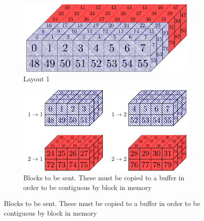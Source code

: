 \begin{figure}[p]
 \begin{center}
 \begin{subfigure}[t]{0.45\textwidth}
  \centering
  \includegraphics[width=\textwidth]{Figs/SplitConcat3D/Layout1}
  \caption{Layout 1}
 \end{subfigure}
 \hspace{0.05\textwidth}
 \begin{subfigure}[t]{0.45\textwidth}
  \centering
  \includegraphics[width=\textwidth]{Figs/SplitConcat3D/SendBlocks}
  \caption{\label{fig::3DSplitConcat send blocks} Blocks to be sent. These must be copied to a buffer in order to be contiguous by block in memory}
 \end{subfigure}
 

\end{center}
\end{figure}
